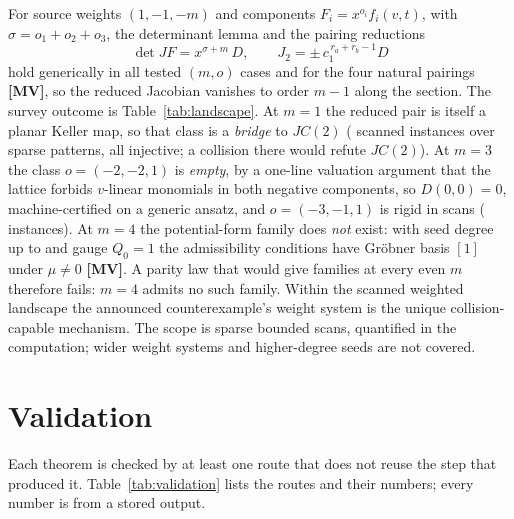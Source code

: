 \documentclass[11pt]{article}
\theoremstyle{definition}
\theoremstyle{remark}
\newcommand{\detJ}{\det JF}
\newcommand{\MV}{\textbf{[MV]}}
\begin{document}
For source weights $(1, -1, -m)$ and components $F_i = x^{o_i} f_i(v,t)$, with $\sigma = o_1 + o_2 + o_3$, the determinant lemma and the pairing reductions
\begin{equation}\label{eq:landscape}
\detJ = x^{\sigma + m}\,D, \qquad J_2 = \pm\, c_1^{\,r_a + r_b - 1} D
\end{equation}
hold generically in all \numLemmaCases{} tested $(m, o)$ cases and for the four natural pairings \MV, so the reduced Jacobian vanishes to order $m - 1$ along the section. The survey outcome is Table~\ref{tab:landscape}. At $m = 1$ the reduced pair is itself a planar Keller map, so that class is a \emph{bridge} to $JC(2)$ (\numBridgeInst{} scanned instances over \numPatterns{} sparse patterns, all injective; a collision there would refute $JC(2)$). At $m = 3$ the class $o = (-2,-2,1)$ is \emph{empty}, by a one-line valuation argument that the lattice forbids $v$-linear monomials in both negative components, so $D(0,0) = 0$, machine-certified on a generic ansatz, and $o = (-3,-1,1)$ is rigid in scans (\numRigidInst{} instances). At $m = 4$ the potential-form family does \emph{not} exist: with seed degree up to \numSeedDegMax{} and gauge $Q_0 = 1$ the \numAdmissCond{} admissibility conditions have Gr\"obner basis $[1]$ under $\mu \neq 0$ \MV. A parity law that would give families at every even $m$ therefore fails: $m = 4$ admits no such family. Within the scanned weighted landscape the announced counterexample's weight system is the unique collision-capable mechanism. The scope is sparse bounded scans, quantified in the computation; wider weight systems and higher-degree seeds are not covered.

\section{Validation}\label{sec:validation}

Each theorem is checked by at least one route that does not reuse the step that produced it. Table~\ref{tab:validation} lists the routes and their numbers; every number is from a stored output.
\end{document}

